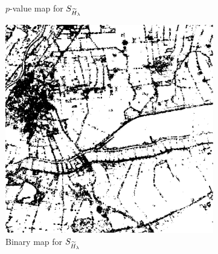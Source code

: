 \documentclass[
  lettersize  journal,
]{IEEEtran}%
\providecommand{\DIFaddtex}[1]{{\protect\color{blue}\uwave{#1}}} %
\providecommand{\DIFaddFL}[1]{\DIFadd{#1}} %
\providecommand{\DIFaddbeginFL}{} %
\providecommand{\DIFaddendFL}{} %
\providecommand{\DIFdelbeginFL}{} %
\providecommand{\DIFdelendFL}{} %
\providecommand{\DIFadd}[1]{\texorpdfstring{\DIFaddtex{#1}}{#1}} %
\newcommand{\DIFscaledelfig}{0.5}
\newlength{\DIFdelgraphicswidth} %
\newlength{\DIFdelgraphicsheight} %
\newcommand{\DIFaddincludegraphics}[2][]{{\color{blue}\fbox{\DIFOincludegraphics[#1]{#2}}}} %
\newcommand{\DIFdelincludegraphics}[2][]{%
\sbox{\DIFdelgraphicsbox}{\DIFOincludegraphics[#1]{#2}}%
\settoboxwidth{\DIFdelgraphicswidth}{\DIFdelgraphicsbox} %
\settoboxtotalheight{\DIFdelgraphicsheight}{\DIFdelgraphicsbox} %
\scalebox{\DIFscaledelfig}{%
\parbox[b]{\DIFdelgraphicswidth}{\usebox{\DIFdelgraphicsbox}\\[-\baselineskip] \rule{\DIFdelgraphicswidth}{0em}}\llap{\resizebox{\DIFdelgraphicswidth}{\DIFdelgraphicsheight}{%
\setlength{\unitlength}{\DIFdelgraphicswidth}%
\begin{picture}(1,1)%
\thicklines\linethickness{2pt} %
{\color[rgb]{1,0,0}\put(0,0){\framebox(1,1){}}}%
{\color[rgb]{1,0,0}\put(0,0){\line( 1,1){1}}}%
{\color[rgb]{1,0,0}\put(0,1){\line(1,-1){1}}}%
\end{picture}%
}\hspace*{3pt}}} %
} %
\DeclareRobustCommand{\DIFaddbeginFL}{\DIFOaddbeginFL \let\includegraphics\DIFaddincludegraphics} %
\DeclareRobustCommand{\DIFaddendFL}{\DIFOaddendFL \let\includegraphics\DIFOincludegraphics} %
\DeclareRobustCommand{\DIFdelbeginFL}{\DIFOdelbeginFL \let\includegraphics\DIFdelincludegraphics} %
\DeclareRobustCommand{\DIFdelendFL}{\DIFOaddendFL \let\includegraphics\DIFOincludegraphics} %
\begin{document}
\begin{figure}[hbt]
\begin{subfigure}{0.178\textwidth}
        \DIFaddendFL \caption{$p$-value map for $\small{S_{\widetilde{H}_{\lambda}}}$}
        \DIFdelbeginFL %
\DIFdelendFL \DIFaddbeginFL \label{fig:munich-renyi}
    \DIFaddendFL \end{subfigure}
    \DIFdelbeginFL %
\DIFdelendFL \DIFaddbeginFL \DIFaddFL{\hspace{0.00001\textwidth}
    }\begin{subfigure}{0.144\textwidth}
        \includegraphics[width=\linewidth]{./Figures-R1/H_005_renyi_munich.png}
        \DIFaddendFL \caption{Binary map for $\small{S_{\widetilde{H}_{\lambda}}}$}
        \DIFdelbeginFL %
\DIFdelendFL \DIFaddbeginFL \label{fig:munich-005-renyi}
    \DIFaddendFL \end{subfigure}
    \DIFdelbeginFL %
\DIFdelendFL \DIFaddbeginFL \DIFaddFL{\hspace{0.00001\textwidth}
    }\begin{subfigure}{0.178\textwidth}

\end{subfigure}
\end{figure}
\end{document}
